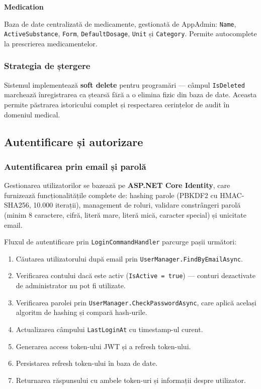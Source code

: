\documentclass[12pt, a4paper]{report}
\begin{document}
\textbf{Medication}

Baza de date centralizată de medicamente, gestionată de AppAdmin: \texttt{Name},
\texttt{ActiveSubstance}, \texttt{Form}, \texttt{DefaultDosage}, \texttt{Unit} și
\texttt{Category}. Permite autocomplete la prescrierea medicamentelor.

\subsubsection{Strategia de ștergere}

Sistemul implementează \textbf{soft delete} pentru programări --- câmpul
\texttt{IsDeleted} marchează înregistrarea ca ștearsă fără a o elimina fizic din baza
de date. Aceasta permite păstrarea istoricului complet și respectarea cerințelor de audit
în domeniul medical.


\subsection{Autentificare și autorizare}

\subsubsection{Autentificarea prin email și parolă}

Gestionarea utilizatorilor se bazează pe \textbf{ASP.NET Core Identity}, care furnizează
funcționalitățile complete de: hashing parole (PBKDF2 cu HMAC-SHA256, 10.000 iterații),
management de roluri, validare constrângeri parolă (minim 8 caractere, cifră, literă mare,
literă mică, caracter special) și unicitate email.

Fluxul de autentificare prin \texttt{LoginCommandHandler} parcurge pașii următori:

\begin{enumerate}
    \item Căutarea utilizatorului după email prin \texttt{UserManager.FindByEmailAsync}.
    \item Verificarea contului dacă este activ (\texttt{IsActive = true}) --- conturi
          dezactivate de administrator nu pot fi utilizate.
    \item Verificarea parolei prin \texttt{UserManager.CheckPasswordAsync}, care aplică
          același algoritm de hashing și compară hash-urile.
    \item Actualizarea câmpului \texttt{LastLoginAt} cu timestamp-ul curent.
    \item Generarea access token-ului JWT și a refresh token-ului.
    \item Persistarea refresh token-ului în baza de date.
    \item Returnarea răspunsului cu ambele token-uri și informații despre utilizator.
\end{enumerate}
\end{document}
